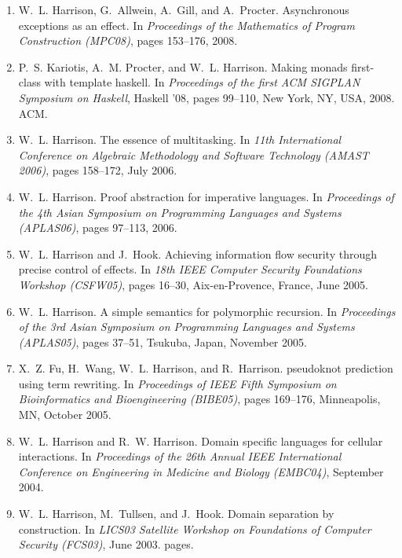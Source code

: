 \documentclass[12pt]{article} %
\begin{document}
\begin{enumerate}[leftmargin=0.0mm]
\item
W.~L. Harrison, G.~Allwein, A.~Gill, and A.~Procter.
\newblock Asynchronous exceptions as an effect.
\newblock In {\em Proceedings of the Mathematics of Program Construction
  (MPC08)}, pages 153--176, 2008.



\item
P.~S. Kariotis, A.~M. Procter, and W.~L. Harrison.
\newblock Making monads first-class with template haskell.
\newblock In {\em Proceedings of the first ACM SIGPLAN Symposium on Haskell},
  Haskell '08, pages 99--110, New York, NY, USA, 2008. ACM.

\item
W.~L. Harrison.
\newblock The essence of multitasking.
\newblock In {\em 11th International Conference on Algebraic Methodology and
  Software Technology {(AMAST 2006)}}, pages 158--172, July 2006.


\item
W.~L. Harrison.
\newblock Proof abstraction for imperative languages.
\newblock In {\em Proceedings of the 4th Asian Symposium on Programming
  Languages and Systems (APLAS06)}, pages 97--113, 2006.

\item
W.~L. Harrison and J.~Hook.
\newblock Achieving information flow security through precise control of
  effects.
\newblock In {\em 18th IEEE Computer Security Foundations Workshop (CSFW05)},
  pages 16--30, Aix-en-Provence, France, June 2005.

\item
W.~L. Harrison.
\newblock A simple semantics for polymorphic recursion.
\newblock In {\em Proceedings of the 3rd Asian Symposium on Programming
  Languages and Systems (APLAS05)}, pages 37--51, Tsukuba, Japan, November
  2005.

\item
X.~Z. Fu, H.~Wang, W.~L. Harrison, and R.~Harrison.
 pseudoknot prediction using term rewriting.
\newblock In {\em Proceedings of IEEE Fifth Symposium on Bioinformatics and
  Bioengineering (BIBE05)}, pages 169--176, Minneapolis, MN, October 2005.

\item
W.~L. Harrison and R.~W. Harrison.
\newblock Domain specific languages for cellular interactions.
\newblock In {\em Proceedings of the 26th Annual IEEE International Conference
  on Engineering in Medicine and Biology (EMBC04)}, September 2004.

\item
W.~L. Harrison, M.~Tullsen, and J.~Hook.
\newblock Domain separation by construction.
\newblock In {\em LICS03 Satellite Workshop on Foundations of Computer Security
  (FCS03)}, June 2003.
 pages.


\end{enumerate}
\end{document}
